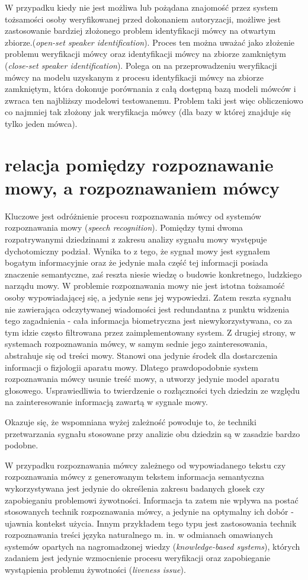 W przypadku kiedy nie jest możliwa lub pożądana znajomość przez system tożsamości osoby weryfikowanej przed dokonaniem autoryzacji, możliwe jest zastosowanie bardziej złożonego problem identyfikacji mówcy na otwartym zbiorze.(\textit{open-set speaker identification}). Proces ten można uważać jako złożenie problemu weryfikacji mówcy oraz identyfikacji mówcy na zbiorze zamkniętym (\textit{close-set speaker identification}). Polega on na przeprowadzeniu weryfikacji mówcy na modelu uzyskanym z procesu identyfikacji mówcy na zbiorze zamkniętym, która dokonuje porównania z całą dostępną bazą modeli mówców i zwraca ten najbliższy modelowi testowanemu. Problem taki jest więc obliczeniowo co najmniej tak złożony jak weryfikacja mówcy (dla bazy w której znajduje się tylko jeden mówca).

\section{relacja pomiędzy rozpoznawanie mowy, a rozpoznawaniem mówcy}
Kluczowe jest odróżnienie procesu rozpoznawania mówcy od systemów rozpoznawania mowy (\textit{speech recognition}). Pomiędzy tymi dwoma rozpatrywanymi dziedzinami z zakresu analizy sygnału mowy występuje dychotomiczny podział. Wynika to z tego, że sygnał mowy jest sygnałem bogatym informacyjnie oraz że jedynie mała część tej informacji posiada znaczenie semantyczne, zaś reszta niesie wiedzę o budowie konkretnego, ludzkiego narządu mowy. W problemie rozpoznawania mowy nie jest istotna tożsamość osoby wypowiadającej się, a jedynie sens jej wypowiedzi. Zatem reszta sygnału nie zawierająca odczytywanej wiadomości jest redundantna z punktu widzenia tego zagadnienia - cała informacja biometryczna jest niewykorzystywana, co za tym idzie często filtrowana przez zaimplementowany system. Z drugiej strony, w systemach rozpoznawania mówcy, w samym sednie jego zainteresowania, abstrahuje się od treści mowy. Stanowi ona jedynie środek dla dostarczenia informacji o fizjologii aparatu mowy. Dlatego prawdopodobnie system rozpoznawania mówcy usunie treść mowy, a utworzy jedynie model aparatu głosowego. Usprawiedliwia to twierdzenie o rozłączności tych dziedzin ze względu na zainteresowanie informacją zawartą w sygnale mowy. 

Okazuje się, że wspomniana wyżej zależność powoduje to, że techniki przetwarzania sygnału stosowane przy analizie obu dziedzin są w zasadzie bardzo podobne. 

W przypadku rozpoznawania mówcy zależnego od wypowiadanego tekstu czy rozpoznawania mówcy z generowanym tekstem informacja semantyczna wykorzystywana jest jedynie do określenia zakresu badanych głosek czy zapobieganiu problemowi żywotności. Informacja ta zatem nie wpływa na postać stosowanych technik rozpoznawania mówcy, a jedynie na optymalny ich dobór - ujawnia kontekst użycia. Innym przykładem tego typu jest zastosowania technik rozpoznawania treści języka naturalnego m. in. w odmianach omawianych systemów opartych na nagromadzonej wiedzy (\textit{knowledge-based systems}), których zadaniem jest jedynie wzmocnienie procesu weryfikacji oraz zapobieganie wystąpienia problemu żywotności (\textit{liveness issue}). 

